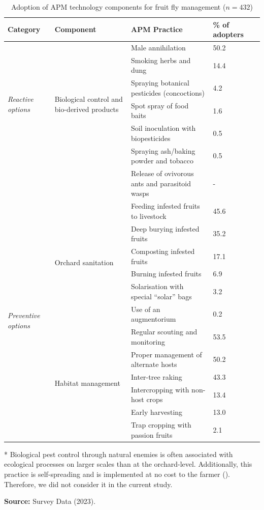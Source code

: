 \documentclass[fleqn,twoside,reqno]{article}
\begin{document}
\begin{table}[!ht]
\begin{threeparttable}[b]
  \centering
  \caption{Adoption of APM technology components for fruit fly management ($n=432$)}
  \label{tab:2}
  \begin{tabularx}{\textwidth}{@{}lXlXc@{}}
    \toprule
    \textbf{Category} & \textbf{Component} & \textbf{APM Practice} & \textbf{\% of adopters}\\
    \midrule
    \multirow{6}{*}{\textit{Reactive options}}& \multirow{6}{=}{Biological control and bio-derived products}& Male annihilation & 50.2 \\
    & & Smoking herbs and dung & 14.4 \\
    & & Spraying botanical pesticides (concoctions) & 4.2 \\
    & & Spot spray of food baits & 1.6 \\
    & & Soil inoculation with biopesticides & 0.5 \\
    & & Spraying ash/baking powder and tobacco & 0.5 \\
    & & Release of ovivorous ants and parasitoid wasps\tnote{*} & - \\
    \midrule
    \multirow{12}{*}{\textit{Preventive options}}& \multirow{6}{=}{Orchard sanitation}& Feeding infested fruits to livestock & 45.6 \\
    & & Deep burying infested fruits & 35.2 \\
    & & Composting infested fruits & 17.1 \\
    & & Burning infested fruits & 6.9 \\
    & & Solarisation with special ``solar'' bags & 3.2 \\
    & & Use of an augmentorium & 0.2 \\
    \cmidrule(lr){2-4}
    & \multirow{7}{=}{Habitat management}& Regular scouting and monitoring & 53.5 \\
    & & Proper management of alternate hosts & 50.2 \\
    & & Inter-tree raking & 43.3 \\
    & & Intercropping with non-host crops & 13.4 \\
    & & Early harvesting & 13.0 \\
    & & Trap cropping with passion fruits & 2.1 \\
    \bottomrule
  \end{tabularx}
  \begin{tablenotes}
      \item [*] \small Biological pest control through natural enemies is often associated with ecological processes on larger scales than at the orchard-level. Additionally, this practice is self-spreading and is implemented at no cost to the farmer (\cite{Korir2015}). Therefore, we did not consider it in the current study.
  \end{tablenotes}
  \smallskip 
  \textbf{Source:} Survey Data (2023).
  \end{threeparttable}
\end{table}
\end{document}
